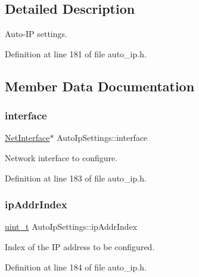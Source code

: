 \subsection{Detailed Description}
Auto-\/\+IP settings. 

Definition at line 181 of file auto\+\_\+ip.\+h.



\subsection{Member Data Documentation}
\mbox{\label{structAutoIpSettings_aefe9b77105f2ee05b5c09d022799c610}} 
\subsubsection{\texorpdfstring{interface}{interface}}
{\footnotesize\ttfamily \hyperlink{net_8h_a2234db8911a1148c9159979d8f5e0d6b}{Net\+Interface}$\ast$ Auto\+Ip\+Settings\+::interface}



Network interface to configure. 



Definition at line 183 of file auto\+\_\+ip.\+h.

\mbox{\label{structAutoIpSettings_ad6a4b80c0e91682a7a8e333720f99e54}} 
\subsubsection{\texorpdfstring{ip\+Addr\+Index}{ipAddrIndex}}
{\footnotesize\ttfamily \hyperlink{compiler__port_8h_a12a1e9b3ce141648783a82445d02b58d}{uint\+\_\+t} Auto\+Ip\+Settings\+::ip\+Addr\+Index}



Index of the IP address to be configured. 



Definition at line 184 of file auto\+\_\+ip.\+h.

\mbox{\label{structAutoIpSettings_a5f12d52e8a17c816e573c730dc28cb28}} 
